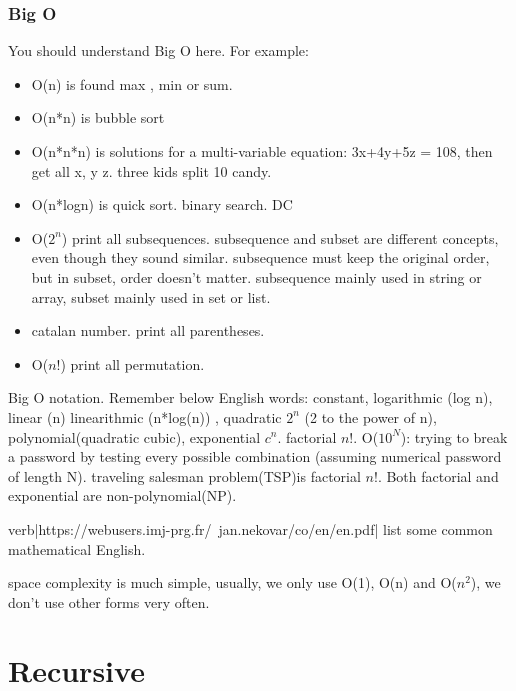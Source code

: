 \documentclass[a4paper,11pt,twoside]{book}
\begin{document}
\subsubsection{Big O}
\par You should understand Big O here. For example:
\begin{itemize}
	\item O(n) is found max , min or sum. 
	
	\item O(n*n) is bubble sort
	
	\item O(n*n*n) is solutions for a multi-variable equation: 3x+4y+5z = 108, then get all x, y z. three kids split 10 candy. 
	
	\item O(n*logn) is quick sort. binary search. DC
	
	\item O($2^{n}$) print all subsequences.  subsequence and subset are different concepts, even though they sound similar. subsequence must keep the original order, but in subset, order doesn't matter.  subsequence mainly used in string or array, subset mainly used in set or list.
	
	\item catalan number. print all parentheses.
	
	\item O($n!$) print all permutation.
\end{itemize}


	\par Big O notation. Remember below English words: constant, logarithmic (log n), linear (n)  linearithmic (n*log(n)) , quadratic $2^{n}$ (2 to the power of n), polynomial(quadratic cubic),  exponential $c^{n}$.  factorial $n!$.  O($10^{N}$): trying to break a password by testing every possible combination (assuming numerical password of length N).  traveling salesman problem(TSP)is factorial $n!$.  Both factorial and exponential are non-polynomial(NP). 

	\par verb|https://webusers.imj-prg.fr/~jan.nekovar/co/en/en.pdf| list some common mathematical English.  

	\par space complexity is much simple, usually, we only use O(1), O(n) and O($n^{2}$), we don't use other forms very often.  

\section{Recursive}
\end{document}
